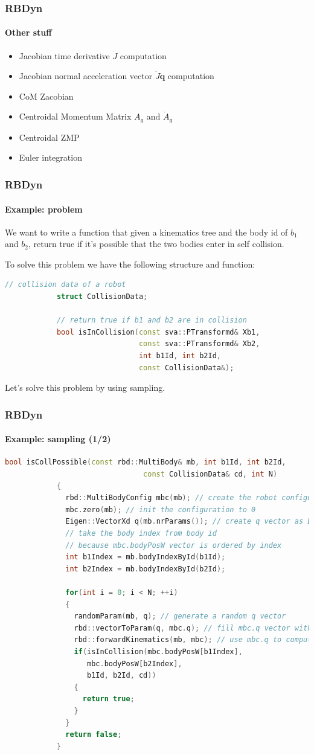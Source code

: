 \documentclass{beamer}
\begin{document}
	\begin{frame}
		\frametitle{RBDyn}
		\framesubtitle{Other stuff}
		\begin{itemize}
			\item Jacobian time derivative $ \dot{J} $ computation
			\item Jacobian normal acceleration vector $ \dot{J}\dot{\mathbf{q}} $ computation
			\item CoM Zacobian
			\item Centroidal Momentum Matrix $ A_g $ and $ \dot{A}_g $
			\item Centroidal ZMP
			\item Euler integration
		\end{itemize}
	\end{frame}

	\begin{frame}[fragile]
		\frametitle{RBDyn}
		\framesubtitle{Example: problem}
		We want to write a function that given a kinematics tree
		and the body id of $ b_1 $ and $ b_2 $, return true if it's possible that the two bodies enter in self collision.
		\\ \hfill

		To solve this problem we have the following structure and function:
		\begin{lstlisting}[language=C++]
			// collision data of a robot
			struct CollisionData;

			// return true if b1 and b2 are in collision
			bool isInCollision(const sva::PTransformd& Xb1,
			                   const sva::PTransformd& Xb2,
			                   int b1Id, int b2Id,
			                   const CollisionData&);
		\end{lstlisting}
		
		Let's solve this problem by using sampling.
	\end{frame}
	\begin{frame}[fragile]
		\frametitle{RBDyn}
		\framesubtitle{Example: sampling (1/2)}
		\begin{lstlisting}[language=C++,basicstyle=\tiny]
			bool isCollPossible(const rbd::MultiBody& mb, int b1Id, int b2Id,
			                    const CollisionData& cd, int N)
			{
			  rbd::MultiBodyConfig mbc(mb); // create the robot configuration
			  mbc.zero(mb); // init the configuration to 0
			  Eigen::VectorXd q(mb.nrParams()); // create q vector as Eigen3 vector
			  // take the body index from body id
			  // because mbc.bodyPosW vector is ordered by index
			  int b1Index = mb.bodyIndexById(b1Id);
			  int b2Index = mb.bodyIndexById(b2Id);

			  for(int i = 0; i < N; ++i)
			  {
			    randomParam(mb, q); // generate a random q vector
			    rbd::vectorToParam(q, mbc.q); // fill mbc.q vector with q
			    rbd::forwardKinematics(mb, mbc); // use mbc.q to compute mbc.bodyPosW
			    if(isInCollision(mbc.bodyPosW[b1Index],
			       mbc.bodyPosW[b2Index],
			       b1Id, b2Id, cd))
			    {
			      return true;
			    }
			  }
			  return false;
			}
		\end{lstlisting}
	\end{frame}
\end{document}
